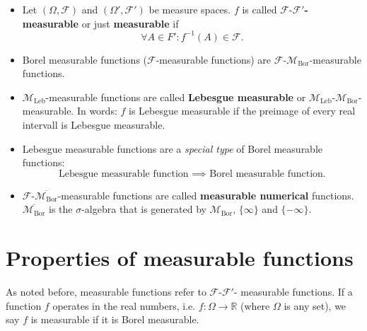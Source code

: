 \documentclass[a4paper, 11pt]{article}
\theoremstyle{plain}
\theoremstyle{definition}
\begin{document}
\begin{itemize}
	\item Let $(\Omega, \mathcal F)$ and $(\Omega', \mathcal F')$ be measure spaces. $f$ is called \textbf{$\mathcal F\text{-}\mathcal F'$-measurable} or just \textbf{measurable} if
	\[
		\forall A \in F': f^{-1}(A) \in \mathcal F.
	\]
	
	\item Borel measurable functions ($\mathcal F$-measurable functions) are $\mathcal F$-$\mathcal M_{\mathrm{Bor}}$-measurable functions.
	
	\item $\mathcal M_{\mathrm{Leb}}$-measurable functions are called \textbf{Lebesgue measurable} or $\mathcal M_{\mathrm{Leb}}$-$\mathcal M_{\mathrm{Bor}}$-measurable. In words: $f$ is Lebesgue measurable if the preimage of every real intervall is Lebesgue measurable.
	
	\item Lebesgue measurable functions are a \emph{special type} of Borel measurable functions:
	\[
		\text{Lebesgue measurable function } \implies \text{ Borel measurable function.}
	\]
	
	\item $\mathcal F$-$\overline{\mathcal M_{\mathrm{Bor}}}$-measurable functions are called \textbf{measurable numerical} functions. $\overline{\mathcal M_{\mathrm{Bor}}}$ is the $\sigma$-algebra that is generated by $\mathcal M_{\mathrm{Bor}}$, $\{ \infty \}$ and $\{ -\infty \}$.
\end{itemize}

\section{Properties of measurable functions}
As noted before, measurable functions refer to $\mathcal F$-$\mathcal F'$- measurable functions. If a function $f$ operates in the real numbers, i.e. $f: \Omega \to \mathbb R$ (where $\Omega$ is any set), we say $f$ is measurable if it is Borel measurable. \\
\end{document}
